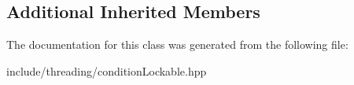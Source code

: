 \subsection*{Additional Inherited Members}


The documentation for this class was generated from the following file\-:\begin{DoxyCompactItemize}
\item 
include/threading/condition\-Lockable.\-hpp\end{DoxyCompactItemize}

